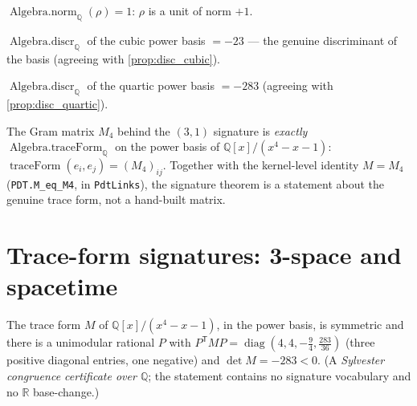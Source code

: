 \begin{proposition}
  \label{prop:norm_r}
  \leanok
  $\operatorname{Algebra.norm}_{\mathbb{Q}}(\rho) = 1$: $\rho$ is a unit of norm $+1$.
\end{proposition}

\begin{proposition}
  \label{prop:discr_c}
  \leanok
  $\operatorname{Algebra.discr}_{\mathbb{Q}}$ of the cubic power basis $= -23$ --- the genuine
  discriminant of the basis (agreeing with \cref{prop:disc_cubic}).
\end{proposition}

\begin{proposition}
  \label{prop:discr_q}
  \leanok
  $\operatorname{Algebra.discr}_{\mathbb{Q}}$ of the quartic power basis $= -283$ (agreeing
  with \cref{prop:disc_quartic}).
\end{proposition}

\begin{proposition}
  \label{prop:traceform}
  \leanok
  The Gram matrix $M_4$ behind the $(3,1)$ signature is \emph{exactly}
  $\operatorname{Algebra.traceForm}_{\mathbb{Q}}$ on the power basis of
  $\mathbb{Q}[x]/(x^4-x-1)$: $\operatorname{traceForm}(e_i,e_j) = (M_4)_{ij}$. Together with the
  kernel-level identity $M = M_4$ (\lstinline{PDT.M_eq_M4}, in \lstinline{PdtLinks}), the
  signature theorem is a statement about the genuine trace form, not a hand-built matrix.
\end{proposition}

\chapter{Trace-form signatures: 3-space and spacetime}

\begin{theorem}
  \label{thm:sig_quartic}
  \leanok
  The trace form $M$ of $\mathbb{Q}[x]/(x^4-x-1)$, in the power basis, is symmetric and there is a
  unimodular rational $P$ with $P^{\mathsf T} M P = \operatorname{diag}(4,4,-\tfrac94,\tfrac{283}{36})$
  (three positive diagonal entries, one negative) and $\det M = -283 < 0$. (A
  \emph{Sylvester congruence certificate over $\mathbb{Q}$}; the statement contains no
  signature vocabulary and no $\mathbb{R}$ base-change.)
\end{theorem}

